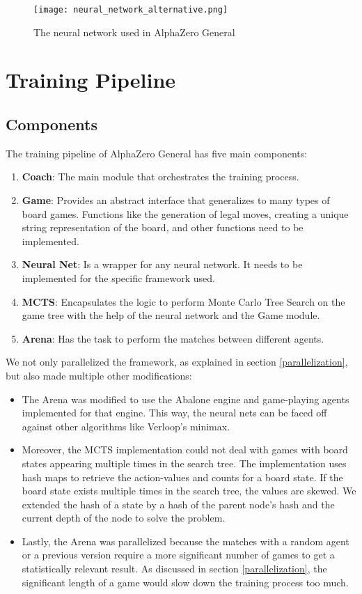 \begin{figure}
    \centering
    \texttt{[image: neural\_network\_alternative.png]}
    \caption{The neural network used in AlphaZero General \cite{thakoor_suragnairalpha-zero-general_nodate}}
    \label{neural_network_alternative}
\end{figure}


\section{Training Pipeline}
\subsection{Components}
\label{components}

The training pipeline of AlphaZero General has five main components:
\begin{enumerate}
    \item \textbf{Coach}: The main module that orchestrates the training process.
    \item \textbf{Game}: Provides an abstract interface that generalizes to many types of board games. Functions like the generation of legal moves, creating a unique string representation of the board, and other functions need to be implemented.
    \item \textbf{Neural Net}: Is a wrapper for any neural network. It needs to be implemented for the specific framework used.
    \item \textbf{MCTS}: Encapsulates the logic to perform Monte Carlo Tree Search on the game tree with the help of the neural network and the Game module.
    \item \textbf{Arena}: Has the task to perform the matches between different agents.
\end{enumerate}

We not only parallelized the framework, as explained in section \ref{parallelization}, but also made multiple other modifications:
\begin{itemize}
    \item The Arena was modified to use the Abalone engine \cite{claussen_abalone_2021} and game-playing agents implemented for that engine. This way, the neural nets can be faced off against other algorithms like Verloop's minimax.
    \item Moreover, the MCTS implementation could not deal with games with board states appearing multiple times in the search tree. The implementation uses hash maps to retrieve the action-values and counts for a board state. If the board state exists multiple times in the search tree, the values are skewed. We extended the hash of a state by a hash of the parent node's hash and the current depth of the node to solve the problem.
    \item Lastly, the Arena was parallelized because the matches with a random agent or a previous version require a more significant number of games to get a statistically relevant result. As discussed in section \ref{parallelization}, the significant length of a game would slow down the training process too much.
\end{itemize}

